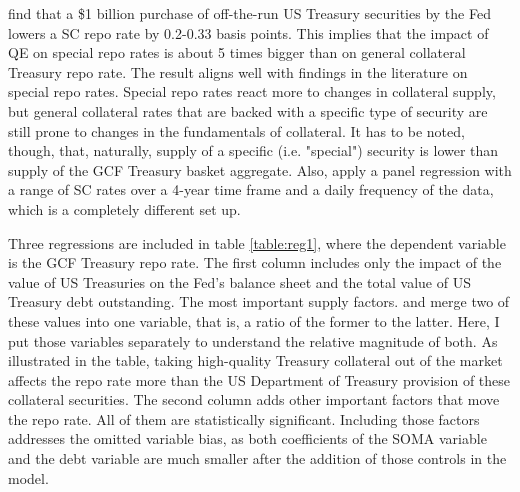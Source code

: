 \documentclass[11pt,a4paper,english,oneside]{article}
\begin{document}
\citet{damico2014} find that a \$1 billion purchase of off-the-run US Treasury securities by the Fed lowers a SC repo rate by 0.2-0.33 basis points. This implies that the impact of QE on special repo rates is about 5 times bigger than on general collateral Treasury repo rate. The result aligns well with findings in the literature on special repo rates. Special repo rates react more to changes in collateral supply, but general collateral rates that are backed with a specific type of security are still prone to changes in the fundamentals of collateral. It has to be noted, though, that, naturally, supply of a specific (i.e. "special") security is lower than supply of the GCF Treasury basket aggregate. Also, \citet{damico2014} apply a panel regression with a range of SC rates over a 4-year time frame and a daily frequency of the data, which is a completely different set up.

Three regressions are included in table \ref{table:reg1}, where the dependent variable is the GCF Treasury repo rate. The first column includes only the impact of the value of US Treasuries on the Fed's balance sheet and the total value of US Treasury debt outstanding. The most important supply factors. \citet{damico2014} and \citet{arrata2018} merge two of these values into one variable, that is, a ratio of the former to the latter. Here, I put those variables separately to understand the relative magnitude of both. As illustrated in the table, taking high-quality Treasury collateral out of the market affects the repo rate more than the US Department of Treasury provision of these collateral securities. The second column adds other important factors that move the repo rate. All of them are statistically significant. Including those factors addresses the omitted variable bias, as both coefficients of the SOMA variable and the debt variable are much smaller after the addition of those controls in the model.

\end{document}
